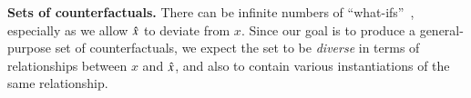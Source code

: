 \textbf{Sets of counterfactuals.} There can be infinite numbers of ``what-ifs''~\cite{pearl2018causal, kahneman}, especially as we allow $\hat{x}$ to deviate from $x$. Since our goal is to produce a general-purpose set of counterfactuals, we expect the set to be \emph{diverse} in terms of relationships between $x$ and $\hat{x}$, and also to contain various instantiations of the same relationship.






